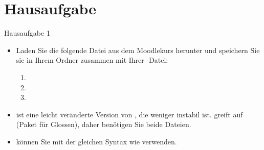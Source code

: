 \section{Hausaufgabe}
%
\begin{frame}{Hausaufgabe 1}

\begin{itemize}
	
	\item Laden Sie die folgende Datei aus dem Moodlekurs herunter und speichern Sie sie in Ihrem Ordner zusammen mit Ihrer -Datei:
	
	\begin{enumerate}
		\item {}
		\item {}
		\item {}
	\end{enumerate}
	
	\item {} ist eine leicht veränderte Version von , die weniger instabil ist.  greift auf  (Paket für Glossen), daher benötigen Sie beide Dateien.
	
	\item {} können Sie mit der gleichen Syntax wie  verwenden.
	
\end{itemize}

\end{frame}


